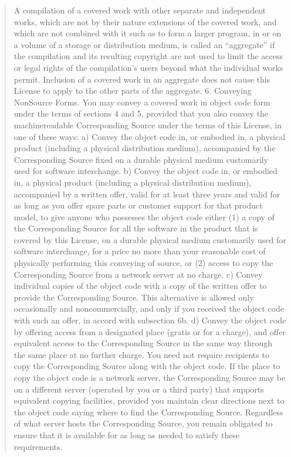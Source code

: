 \documentclass[letterpaper,10pt,english]{sphinxmanual}
\begin{document}
\begin{quote}
A compilation of a covered work with other separate and independent works, which are not by their nature extensions of the covered work, and which are not combined with it such as to form a larger program, in or on a volume of a storage or distribution medium, is called an “aggregate” if the compilation and its resulting copyright are not used to limit the access or legal rights of the compilation’s users beyond what the individual works permit. Inclusion of a covered work in an aggregate does not cause this License to apply to the other parts of the aggregate.
6. Conveying Non\sphinxhyphen{}Source Forms.
You may convey a covered work in object code form under the terms of sections 4 and 5, provided that you also convey the machine\sphinxhyphen{}readable Corresponding Source under the terms of this License, in one of these ways:
a) Convey the object code in, or embodied in, a physical product (including a physical distribution medium), accompanied by the Corresponding Source fixed on a durable physical medium customarily used for software interchange.
b) Convey the object code in, or embodied in, a physical product (including a physical distribution medium), accompanied by a written offer, valid for at least three years and valid for as long as you offer spare parts or customer support for that product model, to give anyone who possesses the object code either (1) a copy of the Corresponding Source for all the software in the product that is covered by this License, on a durable physical medium customarily used for software interchange, for a price no more than your reasonable cost of physically performing this conveying of source, or (2) access to copy the Corresponding Source from a network server at no charge.
c) Convey individual copies of the object code with a copy of the written offer to provide the Corresponding Source. This alternative is allowed only occasionally and noncommercially, and only if you received the object code with such an offer, in accord with subsection 6b.
d) Convey the object code by offering access from a designated place (gratis or for a charge), and offer equivalent access to the Corresponding Source in the same way through the same place at no further charge. You need not require recipients to copy the Corresponding Source along with the object code. If the place to copy the object code is a network server, the Corresponding Source may be on a different server (operated by you or a third party) that supports equivalent copying facilities, provided you maintain clear directions next to the object code saying where to find the Corresponding Source. Regardless of what server hosts the Corresponding Source, you remain obligated to ensure that it is available for as long as needed to satisfy these requirements.

\end{quote}
\end{document}
